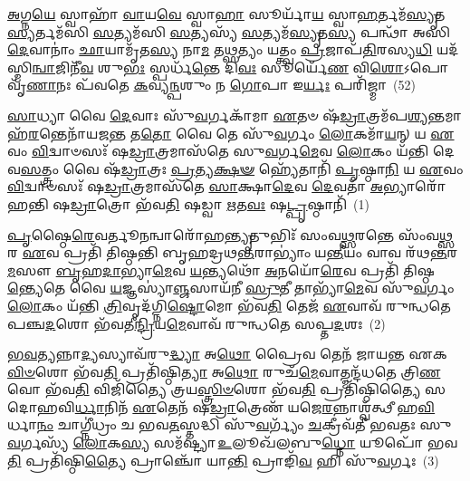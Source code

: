 {\anuvakamend[{}]}

\-\ul{𑌅}\-𑌗𑍍𑌨\-\ul{𑌯𑍇} 𑌸𑍍𑌵𑌾𑌹𑌾᳴ \ul{𑌵𑌾}\-𑌯\-\ul{𑌵𑍇} 𑌸𑍍𑌵𑌾\-\ul{𑌹𑌾} 𑌸𑍂𑌰𑍍𑌯𑌾᳴\-\ul{𑌯} 𑌸𑍍𑌵𑌾\-\ul{𑌹}\-𑌰𑍍𑌤𑌮᳴\-\ul{𑌸𑍍𑌯𑍃}\-𑌤\-\ul{𑌸𑍍𑌯}\-𑌰𑍍𑌤𑌮᳴𑌸𑌿 \ul{𑌸}\-𑌤𑍍𑌯𑌮᳴𑌸𑌿 \ul{𑌸}\-𑌤𑍍𑌯𑌸𑍍𑌯᳴ \ul{𑌸}\-𑌤𑍍𑌯𑌮᳴\-\ul{𑌸𑍍𑌯𑍃}\-𑌤\-\ul{𑌸𑍍𑌯} 𑌪𑌨𑍍𑌥𑌾᳴ 𑌅𑌸𑌿 \ul{𑌦𑍇}\-𑌵𑌾𑌨𑌾𑌂॑ \ul{𑌛𑌾}\-𑌯𑌾𑌮𑍃᳴𑌤\-\ul{𑌸𑍍𑌯} 𑌨𑌾\-\ul{𑌮} 𑌤\-\ul{𑌥𑍍𑌸}\-𑌤𑍍𑌯𑌂 𑌯𑌤𑍍𑌤𑍍𑌵𑌂 \ul{𑌪𑍍𑌰}\-𑌜𑌾𑌪᳴\-\ul{𑌤𑌿}\-𑌰𑌸𑍍𑌯\-\ul{𑌧𑌿} 𑌯𑌦᳴𑌸𑍍𑌮𑌿\-\ul{𑌨𑍍𑌵𑌾}\-𑌜𑌿𑌨𑍀᳴\-\ul{𑌵} 𑌶𑍁\-\ul{𑌭𑌃} 𑌸𑍍𑌪𑌰𑍍𑌧᳴\-\ul{𑌨𑍍𑌤𑍇} 𑌦𑌿\-\ul{𑌵𑌃} 𑌸𑍂𑌰𑍍𑌯𑍇᳴\-\ul{𑌣} 𑌵𑌿\-\ul{𑌶𑍋}\-\-𑌽𑌪𑍋 𑌵𑍃᳴\-\ul{𑌣𑌾}\-𑌨𑌃 𑌪᳴𑌵𑌤𑍇 \ul{𑌕}\-𑌵𑍍𑌯\-\ul{𑌨𑍍𑌪}\-𑌶𑍁𑌂 𑌨 \ul{𑌗𑍋}\-𑌪𑌾 𑌇\-\ul{𑌰𑍍𑌯𑌃} 𑌪𑌰𑌿᳴𑌜𑍍𑌮𑌾~(52)


{\anuvakamend[{}]}


\setcounter{anuvakam}{0}
\-\ul{𑌸𑌾}\-𑌧𑍍𑌯𑌾 𑌵𑍈 \ul{𑌦𑍇}\-𑌵𑌾𑌃 𑌸𑍁᳴\-\ul{𑌵}\-𑌰𑍍𑌗𑌕𑌾᳴𑌮𑌾 \ul{𑌏}\-𑌤𑍞 𑌷᳴\-\ul{𑌡𑍍𑌰𑌾}\-𑌤𑍍𑌰𑌮᳴𑌪\-\ul{𑌶𑍍𑌯}\-𑌨𑍍𑌤𑌮𑌾𑌹᳴\-\ul{𑌰}\-𑌨𑍍𑌤𑍇𑌨𑌾᳴𑌯𑌜\-\ul{𑌨𑍍𑌤} 𑌤\-\ul{𑌤𑍋} 𑌵𑍈 𑌤𑍇 𑌸𑍁᳴\-\ul{𑌵}\-𑌰𑍍𑌗𑌂 \ul{𑌲𑍋}\-𑌕𑌮𑌾᳴\-\ul{𑌯}\-𑌨𑍍 𑌯 \ul{𑌏}\-𑌵𑌂 \ul{𑌵𑌿}\-𑌦𑍍𑌵𑌾𑍞𑌸𑌃᳴ 𑌷\-\ul{𑌡𑍍𑌰𑌾}\-𑌤𑍍𑌰𑌮𑌾𑌸᳴𑌤𑍇 𑌸𑍁\-\ul{𑌵}\-𑌰𑍍𑌗\-\ul{𑌮𑍇}\-𑌵 \ul{𑌲𑍋}\-𑌕𑌂 𑌯᳴𑌨𑍍𑌤𑌿 𑌦𑍇𑌵\-\ul{𑌸}\-𑌤𑍍𑌤𑍍𑌰𑌂 𑌵𑍈 𑌷᳴\-\ul{𑌡𑍍𑌰𑌾}\-𑌤𑍍𑌰𑌃 \ul{𑌪𑍍𑌰}\-𑌤𑍍𑌯\-\ul{𑌕𑍍𑌷}\-\-\ul{𑍟} 𑌹𑍍𑌯𑍇᳴𑌤𑌾𑌨𑌿᳴ \ul{𑌪𑍃}\-𑌷𑍍𑌠𑌾\-\ul{𑌨𑌿} 𑌯 \ul{𑌏}\-𑌵𑌂 \ul{𑌵𑌿}\-𑌦𑍍𑌵𑌾𑍞𑌸𑌃᳴ 𑌷\-\ul{𑌡𑍍𑌰𑌾}\-𑌤𑍍𑌰𑌮𑌾𑌸᳴𑌤𑍇 \ul{𑌸𑌾}\-𑌕𑍍𑌷𑌾\-\ul{𑌦𑍇}\-𑌵 \ul{𑌦𑍇}\-𑌵𑌤𑌾᳴ \ul{𑌅}\-𑌭𑍍𑌯𑌾𑌰𑍋᳴𑌹𑌨𑍍𑌤𑌿 𑌷\-\ul{𑌡𑍍𑌰𑌾}\-𑌤𑍍𑌰𑍋 𑌭᳴𑌵\-\ul{𑌤𑌿} 𑌷𑌡𑍍𑌵𑌾 \ul{𑌋}\-𑌤\-\ul{𑌵𑌃} 𑌷\-\ul{𑌟𑍍𑌪𑍃}\-𑌷𑍍𑌠𑌾𑌨𑌿᳴~(1)

\-\ul{𑌪𑍃}\-𑌷𑍍𑌠𑍈\-\ul{𑌰𑍇}\-𑌵𑌰𑍍𑌤𑍂\-\ul{𑌨}\-𑌨𑍍𑌵𑌾𑌰𑍋᳴𑌹\-\ul{𑌨𑍍𑌤𑍍𑌯𑍃}\-𑌤𑍁𑌭𑌿𑌃᳴ 𑌸𑌂𑌵\-\ul{𑌥𑍍𑌸}\-𑌰𑌨𑍍𑌤𑍇 𑌸𑌂᳴𑌵\-\ul{𑌥𑍍𑌸}\-𑌰 \ul{𑌏}\-𑌵 𑌪𑍍𑌰𑌤𑌿᳴ 𑌤𑌿𑌷𑍍𑌠𑌨𑍍𑌤𑌿 𑌬𑍃𑌹𑌦𑍍𑌰𑌥\-\ul{𑌨𑍍𑌤}\-𑌰𑌾\-𑌭𑍍𑌯𑌾𑌂॑ 𑌯\-\ul{𑌨𑍍𑌤𑍀}\-𑌯𑌂 𑌵𑌾𑌵 𑌰᳴𑌥\-\ul{𑌨𑍍𑌤}\-𑌰\-\ul{𑌮}\-𑌸𑍗 \ul{𑌬𑍃}\-𑌹\-\ul{𑌦𑌾}\-𑌭𑍍𑌯𑌾\-\ul{𑌮𑍇}\-𑌵 \ul{𑌯}\-𑌨𑍍𑌤𑍍𑌯𑌥𑍋᳴ \ul{𑌅}\-𑌨𑌯𑍋᳴\-\ul{𑌰𑍇}\-𑌵 𑌪𑍍𑌰𑌤𑌿᳴ 𑌤𑌿𑌷𑍍𑌠\-\ul{𑌨𑍍𑌤𑍍𑌯𑍇}\-𑌤𑍇 𑌵𑍈 \ul{𑌯}\-𑌜𑍍𑌞𑌸𑍍𑌯𑌾॑\-\ul{𑌞𑍍𑌜}\-𑌸𑌾𑌯᳴𑌨𑍀 \ul{𑌸𑍍𑌰𑍁}\-𑌤𑍀 𑌤𑌾𑌭𑍍𑌯𑌾᳴\-\ul{𑌮𑍇}\-𑌵 𑌸𑍁᳴\-\ul{𑌵}\-𑌰𑍍𑌗𑌂 \ul{𑌲𑍋}\-𑌕𑌂 𑌯᳴𑌨𑍍𑌤𑌿 \ul{𑌤𑍍𑌰𑌿}\-𑌵𑍃𑌦᳴𑌗𑍍𑌨𑌿\-\ul{𑌷𑍍𑌟𑍋}\-𑌮𑍋 𑌭᳴𑌵\-\ul{𑌤𑌿} 𑌤𑍇𑌜᳴ \ul{𑌏}\-𑌵𑌾𑌵᳴ 𑌰𑍁𑌨𑍍𑌧𑌤𑍇 𑌪𑌞𑍍𑌚\-\ul{𑌦}\-𑌶𑍋 𑌭᳴𑌵𑌤𑍀\-\ul{𑌨𑍍𑌦𑍍𑌰𑌿}\-𑌯\-\ul{𑌮𑍇}\-𑌵𑌾𑌵᳴ 𑌰𑍁𑌨𑍍𑌧𑌤𑍇 𑌸𑌪𑍍𑌤\-\ul{𑌦}\-𑌶𑌃~(2)

\-\ul{𑌭}\-\-\ul{𑌵}\-\-\ul{𑌤𑍍𑌯}\-𑌨𑍍𑌨𑌾\-\ul{𑌦𑍍𑌯}\-𑌸𑍍𑌯𑌾𑌵᳴𑌰𑍁\-\ul{𑌦𑍍𑌧𑍍𑌯𑌾} 𑌅\-\ul{𑌥𑍋} 𑌪𑍍𑌰𑍈𑌵 𑌤𑍇𑌨᳴ 𑌜𑌾𑌯𑌨𑍍𑌤 𑌏𑌕\-\ul{𑌵𑌿}\-\-\ul{𑍞}\-𑌶𑍋 𑌭᳴𑌵\-\ul{𑌤𑌿} 𑌪𑍍𑌰𑌤𑌿᳴𑌷𑍍𑌠𑌿\-\ul{𑌤𑍍𑌯𑌾} 𑌅\-\ul{𑌥𑍋} 𑌰𑍁𑌚᳴\-\ul{𑌮𑍇}\-𑌵𑌾𑌤𑍍𑌮𑌨𑍍𑌦᳴𑌧𑌤𑍇 𑌤𑍍𑌰𑌿\-\ul{𑌣}\-𑌵𑍋 𑌭᳴𑌵\-\ul{𑌤𑌿} 𑌵𑌿𑌜𑌿᳴𑌤𑍍𑌯𑍈 𑌤𑍍𑌰𑌯\-\ul{𑌸𑍍𑌤𑍍𑌰𑌿}\-\-\ul{𑍞}\-𑌶𑍋 𑌭᳴𑌵\-\ul{𑌤𑌿} 𑌪𑍍𑌰𑌤𑌿᳴𑌷𑍍𑌠𑌿𑌤𑍍𑌯𑍈 𑌸𑌦𑍋𑌹𑌵𑌿\-\ul{𑌰𑍍𑌧𑌾}\-𑌨𑌿𑌨᳴ \ul{𑌏}\-𑌤𑍇𑌨᳴ 𑌷\-\ul{𑌡𑍍𑌰𑌾}\-𑌤𑍍𑌰𑍇𑌣᳴ 𑌯𑌜𑍇\-\ul{𑌰}\-𑌨𑍍𑌨𑌾𑌶𑍍𑌵᳴𑌤𑍍𑌥𑍀 𑌹\-\ul{𑌵𑌿}\-𑌰𑍍𑌧𑌾\-\ul{𑌨𑌂} 𑌚𑌾𑌗𑍍𑌨𑍀॑𑌧𑍍𑌰𑌂 𑌚 𑌭𑌵\-\ul{𑌤}\-𑌸𑍍𑌤𑌦𑍍𑌧𑌿 𑌸𑍁᳴\-\ul{𑌵}\-𑌰𑍍𑌗𑍍𑌯𑌂᳴ \ul{𑌚}\-𑌕𑍍𑌰𑍀𑌵᳴𑌤𑍀 𑌭𑌵𑌤𑌃 𑌸𑍁\-\ul{𑌵}\-𑌰𑍍𑌗𑌸𑍍𑌯᳴ \ul{𑌲𑍋}\-𑌕\-\ul{𑌸𑍍𑌯} 𑌸𑌮᳴𑌷𑍍𑌟𑍍𑌯𑌾 \ul{𑌉}\-𑌲𑍂𑌖᳴𑌲𑌬𑍁\-\ul{𑌧𑍍𑌨𑍋} 𑌯𑍂𑌪𑍋᳴ 𑌭𑌵\-\ul{𑌤𑌿} 𑌪𑍍𑌰𑌤𑌿᳴𑌷𑍍𑌠𑌿\-\ul{𑌤𑍍𑌯𑍈} 𑌪𑍍𑌰𑌾𑌞𑍍𑌚𑍋᳴ 𑌯𑌾\-\ul{𑌨𑍍𑌤𑌿} 𑌪𑍍𑌰𑌾𑌙𑌿᳴\-\ul{𑌵} 𑌹𑌿 𑌸𑍁᳴\-\ul{𑌵}\-𑌰𑍍𑌗𑌃~(3)

